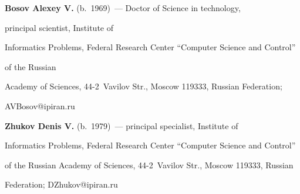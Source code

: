 \textbf{Bosov Alexey V.} (b.\ 1969)~--- Doctor of Science in technology,


principal scientist, Institute of


Informatics Problems, Federal Research Center ``Computer Science and Control''


of the Russian


Academy of Sciences, 44-2~Vavilov Str., Moscow 119333, Russian Federation;


\mbox{AVBosov@ipiran.ru}





\vspace*{3pt}





\noindent


\textbf{Zhukov Denis V.} (b.\ 1979)~--- principal specialist, Institute of


Informatics Problems, Federal Research Center ``Computer Science and Control''


of the Russian Academy of Sciences, 44-2~Vavilov Str., Moscow 119333, Russian


Federation; \mbox{DZhukov@ipiran.ru}





\label{end\stat}





\renewcommand{\bibname}{\protect\rm Литература}


